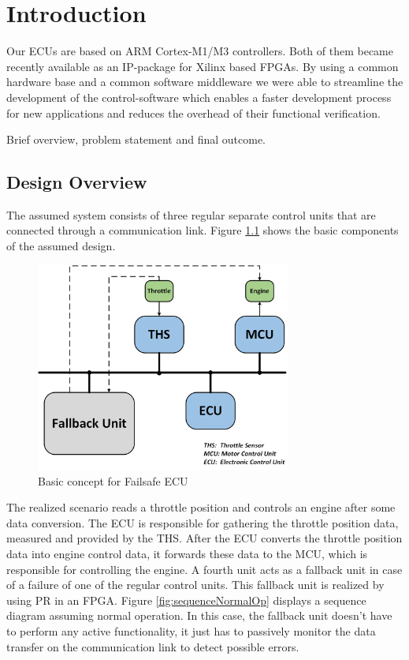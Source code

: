 \chapter{Introduction}

Our \glspl{ECU} are based on ARM Cortex-M1/M3 controllers. Both of them became recently available as an \gls{IP}-package for Xilinx based \glspl{FPGA}.
By using a common hardware base and a common software middleware we were able to streamline the development of the control-software which enables a faster development process for new applications and reduces the overhead of their functional verification.
 
Brief overview, problem statement and final outcome.

\section{Design Overview}

The assumed system consists of three regular separate control units that are connected through a communication link. Figure \ref{fig:basicDesign} shows the basic components of the assumed design.

\begin{figure}[h!]
    \centering
    \includegraphics[width=0.75\textwidth]{figures/basic_design.png}
    \caption{Basic concept for Failsafe ECU}\label{fig:basicDesign}
\end{figure}

The realized scenario reads a throttle position and controls an engine after some data conversion. The \gls{ECU} is responsible for gathering the throttle position data, measured and provided by the \gls{THS}. After the \gls{ECU} converts the throttle position data into engine control data, it forwards these data to the \gls{MCU}, which is responsible for controlling the engine. A fourth unit acts as a fallback unit in case of a failure of one of the regular control units. This fallback unit is realized by using \gls{PR} in an \gls{FPGA}. Figure \ref{fig:sequenceNormalOp} displays a sequence diagram assuming normal operation. In this case, the fallback unit doesn't have to perform any active functionality, it just has to passively monitor the data transfer on the communication link to detect possible errors.


